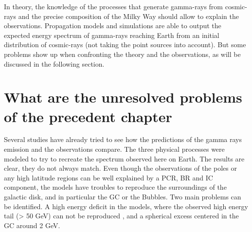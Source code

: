 

In theory, the knowledge of the processes that generate gamma-rays from cosmic-rays and the precise composition of the Milky Way should allow to explain the observations. Propagation models and simulations are able to output the expected energy spectrum of gamma-rays reaching Earth from an initial distribution of cosmic-rays (not taking the point sources into account). But some problems show up when confronting the theory and the observations, as will be discussed in the following section.



\section{What are the unresolved problems of the precedent chapter}
%	
%


%
%
%

Several studies have already tried to see how the predictions of the gamma rays emission and the observations compare. The three physical processes were modeled to try to recreate the spectrum observed here on Earth. The results are clear, they do not always match.
Even though the observations of the poles or any high latitude regions can be well explained by a PCR, BR and IC component, the models have troubles to reproduce the surroundings of the galactic disk, and in particular the GC or the Bubbles. 
Two main problems can be identified. A high energy deficit in the models, where the observed high energy tail (> 50 GeV) can not be reproduced , and a spherical excess centered in the GC around 2 GeV.

